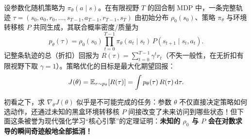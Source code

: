设参数化随机策略为 $\pi_\theta(a \mid s)$。在有限视野 $T$ 的回合制 MDP 中，一条完整轨迹 $\tau = (s_0, a_0, r_0, \dots,\allowbreak s_{T-1}, a_{T-1}, r_{T-1}, s_T)$ 由初始分布 $\rho_0(s_0)$、策略 $\pi_\theta$ 与环境转移核 $P$ 共同生成，其联合概率密度/质量为
\begin{equation}
  p_\theta(\tau) = \rho_0(s_0) \prod_{t=0}^{T-1} \pi_\theta(a_t \mid s_t)\, P(s_{t+1} \mid s_t, a_t).
  \label{eq:traj-prob}
\end{equation}
记整条轨迹的总（折扣）回报为 $R(\tau) = \sum_{t=0}^{T-1} \gamma^t r_t$（不失一般性，在无折扣有限视野下取 $\gamma = 1$）。策略优化的目标是最大化期望回报：
\[
  J(\theta) = \mathbb{E}_{\tau \sim p_\theta}[R(\tau)] = \int p_\theta(\tau)\, R(\tau)\,\mathrm{d}\tau.
\]

初看之下，求 $\nabla_\theta J(\theta)$ 似乎是不可能完成的任务：参数 $\theta$ 不仅直接决定策略如何选动作，还通过未知的黑盒环境转移核 $P$ 间接改变了未来访问到哪些状态！但下面这条被誉为现代强化学习“核心引擎”的定理证明：\textbf{未知的 $\rho_0$ 与 $P$ 会在对数求导的瞬间奇迹般地全部抵消！}

